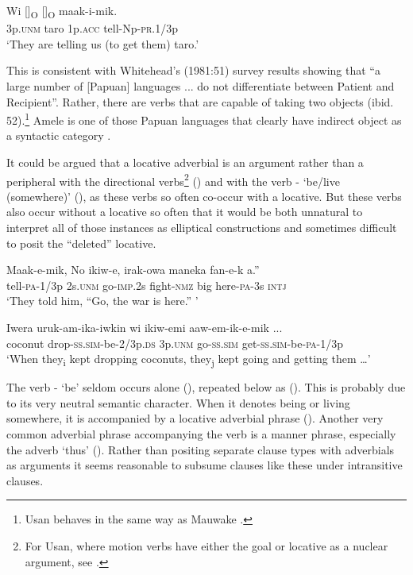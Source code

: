 \ea%
\label{ex:x932}
\gll Wi  []\textsubscript{O}  []\textsubscript{O}  maak-i-mik. \\
     3p.\textsc{unm}  taro  1p.\textsc{acc}  tell-Np-\textsc{pr}.1/3p \\
\glt `They are telling us (to get them) taro.'
\z

This is consistent with Whitehead's (1981:51) survey results showing that ``a large number of [Papuan] languages ... do not differentiate between Patient and Recipient''. Rather, there are verbs that are capable of taking two objects (ibid. 52).\footnote{Usan behaves in the same way as Mauwake \citep[160]{Reesink1987}.} Amele is one of those Papuan languages that clearly have indirect object as a syntactic category \citep[69]{Roberts1987}.

It could be argued that a locative adverbial is an argument rather than a peripheral with the directional verbs\footnote{For Usan, where motion verbs have either the goal or locative as a nuclear argument, see \citet[130]{Reesink1987}.} () and with the verb - `be/live (somewhere)' (), as these verbs so often co-occur with a locative. But these verbs also occur without a locative so often that it would be both unnatural to interpret all of those instances as elliptical constructions and sometimes difficult to posit the ``deleted'' locative. 

\ea%
\label{ex:x1456}
\gll Maak-e-mik,  {\textquotedbl}No  ikiw-e,  irak-owa  maneka fan-e-k  a.'' \\
     tell-\textsc{pa}-1/3p  2s.\textsc{unm}  go-\textsc{imp}.2s  fight-\textsc{nmz}  big here-\textsc{pa}-3s  \textsc{intj} \\
\glt `They told him, ``Go, the war is here.'' '
\z

\ea%
\label{ex:x1457}
\gll Iwera  uruk-am-ika-iwkin  wi  ikiw-emi aaw-em-ik-e-mik ... \\
     coconut  drop-\textsc{ss}.\textsc{sim}-be-2/3p.\textsc{ds}  3p.\textsc{unm}  go-\textsc{ss}.\textsc{sim} get-\textsc{ss}.\textsc{sim}-be-\textsc{pa}-1/3p \\
\glt `When they\textsubscript{i} kept dropping coconuts, they\textsubscript{j} kept going and getting them {\dots}'
\z

The verb - `be' seldom occurs alone (), repeated below as (). This is probably due to its very neutral semantic character. When it denotes being or living somewhere, it is accompanied by a locative adverbial phrase (). Another very common adverbial phrase accompanying the verb is a manner phrase, especially the adverb  `thus' (). Rather than positing separate clause types with adverbials as arguments it seems reasonable to subsume clauses like these under intransitive clauses.

